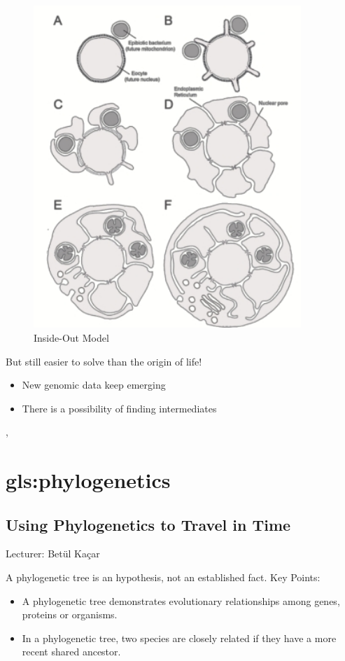 \documentclass[]{article}
\begin{document}
\begin{figure}[H]
	\caption{Inside-Out Model}\label{fig:inside:out}
	\includegraphics[width=0.9\textwidth]{InsideOut}
\end{figure}

But still easier to solve than the origin of life!
\begin{itemize}
	\item New genomic data keep emerging
	\item There is a possibility of finding intermediates
\end{itemize}

\cite{javaux2003recognizing},  

\section{\Gls{gls:phylogenetics}}


\subsection{Using Phylogenetics to Travel in Time}
Lecturer: Bet{\"u}l Ka{\c c}ar

A phylogenetic tree is an hypothesis, not an established fact. Key Points:
\begin{itemize}
	\item A phylogenetic tree demonstrates evolutionary
	relationships among genes, proteins or organisms.
	\item In a phylogenetic tree, two species are closely
	related if they have a more recent shared ancestor.
\end{itemize}
\end{document}
